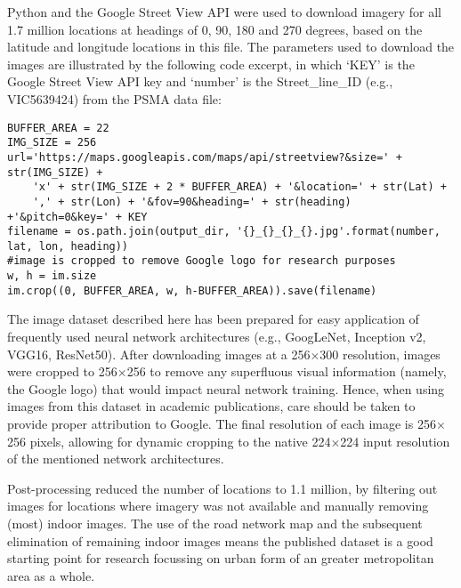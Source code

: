 \documentclass[final,3p,times,authoryear]{elsarticle}
\begin{document}
Python and the Google Street View API \citep{GoogleMaps2017b} were used to download imagery for all 1.7 million locations at headings of 0, 90, 180 and 270 degrees, based on the latitude and longitude locations in this file. The parameters used to download the images are illustrated by the following code excerpt, in which `KEY' is the Google Street View API key and `number' is the Street\_line\_ID (e.g., VIC5639424) from the PSMA data file:

\begin{verbatim}
BUFFER_AREA = 22
IMG_SIZE = 256
url='https://maps.googleapis.com/maps/api/streetview?&size=' + str(IMG_SIZE) +
    'x' + str(IMG_SIZE + 2 * BUFFER_AREA) + '&location=' + str(Lat) +
    ',' + str(Lon) + '&fov=90&heading=' + str(heading) +'&pitch=0&key=' + KEY         
filename = os.path.join(output_dir, '{}_{}_{}_{}.jpg'.format(number, lat, lon, heading))
#image is cropped to remove Google logo for research purposes
w, h = im.size
im.crop((0, BUFFER_AREA, w, h-BUFFER_AREA)).save(filename)
\end{verbatim}

The image dataset described here has been prepared for easy application of frequently used neural network architectures (e.g., GoogLeNet, Inception v2, VGG16, ResNet50). After downloading images at a 256$\times$300 resolution, images were cropped to 256$\times$256 to remove any superfluous visual information (namely, the Google logo) that would impact neural network training. Hence, when using images from this dataset in academic publications, care should be taken to provide proper attribution to Google. The final resolution of each image is 256$\times$256 pixels, allowing for dynamic cropping to the native 224$\times$224 input resolution of the mentioned network architectures.

Post-processing reduced the number of locations to 1.1 million, by filtering out images for locations where imagery was not available and manually removing (most) indoor images. The use of the road network map and the subsequent elimination of remaining indoor images means the published dataset is a good starting point for research focussing on urban form of an greater metropolitan area as a whole.

 


\appendix
\setcounter{table}{0}
\renewcommand{\thetable}{A\arabic{table}}
\end{document}

